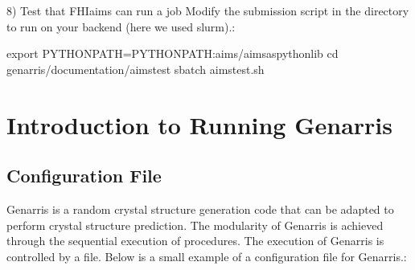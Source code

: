 \documentclass[letterpaper,10pt,english]{sphinxmanual}
\begin{document}
8) Test that FHI\sphinxhyphen{}aims can run a job
Modify the submission script in the 
directory to run on your backend (here we used slurm).:

\begin{sphinxVerbatim}[commandchars=\\\{\}]
export PYTHONPATH=\PYGZdl{}PYTHONPATH:\PYGZdl{}aims/aims\PYGZus{}as\PYGZus{}python\PYGZus{}lib
cd \PYGZdl{}genarris/documentation/aims\PYGZus{}test
sbatch aims\PYGZus{}test.sh
\end{sphinxVerbatim}


\chapter{Introduction to Running Genarris}
\label{\detokenize{index:introduction-to-running-genarris}}

\section{Configuration File}
\label{\detokenize{index:configuration-file}}
Genarris is a random crystal structure generation code that can be adapted to
perform  crystal structure prediction. The modularity of Genarris
is achieved through the sequential execution of procedures. The execution of
Genarris is controlled by a  file. Below is a small example
of a configuration file for Genarris.:

\begin{sphinxVerbatim}[commandchars=\\\{\}]
\PYG{p}{[}\PYG{p}{]}
  \PYG{p}{[}\PYG{p}{]}

\PYG{p}{[}\PYG{p}{]}
  
  
  
  
  
  
  
  
  
  
  
\end{sphinxVerbatim}
\end{document}
